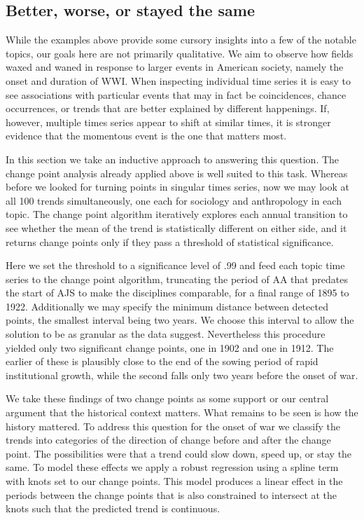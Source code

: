 \documentclass[]{book}
\theoremstyle{definition}
\theoremstyle{definition}
\theoremstyle{definition}
\theoremstyle{remark}
\begin{document}
\hypertarget{better-worse-or-stayed-the-same}{%
\subsection{Better, worse, or stayed the
same}\label{better-worse-or-stayed-the-same}}

While the examples above provide some cursory insights into a few of the
notable topics, our goals here are not primarily qualitative. We aim to
observe how fields waxed and waned in response to larger events in
American society, namely the onset and duration of WWI. When inspecting
individual time series it is easy to see associations with particular
events that may in fact be coincidences, chance occurrences, or trends
that are better explained by different happenings. If, however, multiple
times series appear to shift at similar times, it is stronger evidence
that the momentous event is the one that matters most.

In this section we take an inductive approach to answering this
question. The change point analysis already applied above is well suited
to this task. Whereas before we looked for turning points in singular
times series, now we may look at all 100 trends simultaneously, one each
for sociology and anthropology in each topic. The change point algorithm
iteratively explores each annual transition to see whether the mean of
the trend is statistically different on either side, and it returns
change points only if they pass a threshold of statistical significance.

Here we set the threshold to a significance level of .99 and feed each
topic time series to the change point algorithm, truncating the period
of AA that predates the start of AJS to make the disciplines comparable,
for a final range of 1895 to 1922. Additionally we may specify the
minimum distance between detected points, the smallest interval being
two years. We choose this interval to allow the solution to be as
granular as the data suggest. Nevertheless this procedure yielded only
two significant change points, one in 1902 and one in 1912. The earlier
of these is plausibly close to the end of the sowing period of rapid
institutional growth, while the second falls only two years before the
onset of war.

We take these findings of two change points as some support or our
central argument that the historical context matters. What remains to be
seen is how the history mattered. To address this question for the onset
of war we classify the trends into categories of the direction of change
before and after the change point. The possibilities were that a trend
could slow down, speed up, or stay the same. To model these effects we
apply a robust regression using a spline term with knots set to our
change points. This model produces a linear effect in the periods
between the change points that is also constrained to intersect at the
knots such that the predicted trend is continuous.
\end{document}
